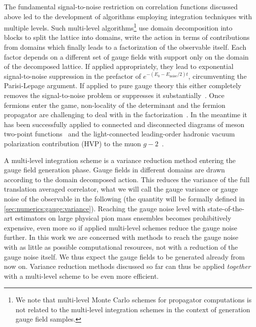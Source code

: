 The fundamental signal-to-noise restriction on correlation functions discussed above led to the development of algorithms employing integration techniques with multiple levels.
Such multi-level algorithms\footnote{We note that multi-level Monte Carlo schemes for propagator computations is not related to the multi-level integration schemes in the context of generation gauge field samples.} use domain decomposition into blocks  to split the lattice into domains, write the action in terms of contributions from domains which finally leads to a factorization of the observable itself.
Each factor depends on a different set of gauge fields with support only on the domain of the decomposed lattice.
If applied appropriately, they lead to exponential signal-to-noise suppression in the prefactor of $e^{-(E_0 - E_{\text{noise}}/2)t}$, circumventing the Parisi-Lepage argument.
If applied to pure gauge theory this either completely removes the signal-to-noise problem or suppresses it substantially~\cite{Luscher:2001up,Meyer:2002cd,DellaMorte:2007zz,DellaMorte:2008jd,della2011novel}.
Once fermions enter the game, non-locality of the determinant and the fermion propagator are challenging to deal with in the factorization~\cite{Ce:2016idq,Ce:2016ajy,Giusti:2017ksp,Ce:2017ndt}.
In the meantime it has been successfully applied to connected and disconnected diagrams of meson two-point functions~\cite{Giusti:2018vxm} and the light-connected leading-order hadronic vacuum polarization contribution (HVP) to the muon $g-2$~\cite{DallaBrida:2020cik,Giusti:2021qhk}.

A multi-level integration scheme is a variance reduction method entering the gauge field generation phase.
Gauge fields in different domains are drawn according to the domain decomposed action.
This reduces the variance of the full translation averaged correlator, \ie what we will call the gauge variance or gauge noise of the observable in the following (the quantity will be formally defined in \cref{sec:numerics:gauge:variance}).
Reaching the gauge noise level with state-of-the-art estimators on large physical pion mass ensembles becomes prohibitively expensive, even more so if applied multi-level schemes reduce the gauge noise further.
In this work we are concerned with methods to reach the gauge noise with as little as possible computational resources, not with a reduction of the gauge noise itself.
We thus expect the gauge fields to be generated already from now on.
Variance reduction methods discussed so far can thus be applied \emph{together} with a multi-level scheme to be even more efficient. 


